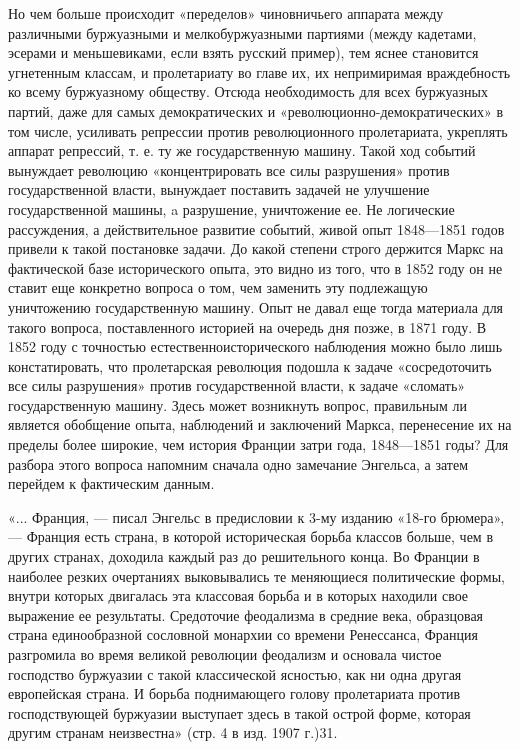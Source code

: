 \documentclass[12pt]{article}
\newcommand{\parnum}{(\arabic{parcount})}
\newcounter{parcount}
\newcommand\p{%
    \stepcounter{parcount}%
    \noindent\marginpar[]{\parnum}%
}
\begin{document}
\p Но чем больше происходит «переделов» чиновничьего аппарата между различными буржуазными и мелкобуржуазными партиями (между кадетами, эсерами и меньшевиками, если взять русский пример), тем яснее становится угнетенным классам, и пролетариату во главе их, их непримиримая враждебность ко всему буржуазному обществу. Отсюда необходимость для всех буржуазных партий, даже для самых демократических и «революционно-демократических» в том числе, усиливать репрессии против революционного пролетариата, укреплять аппарат репрессий, т. е. ту же государственную машину. Такой ход событий вынуждает революцию «концентрировать все силы разрушения» против государственной власти, вынуждает поставить задачей не улучшение государственной машины, a разрушение, уничтожение ее. Не логические рассуждения, а действительное развитие событий, живой опыт 1848—1851 годов привели к такой постановке задачи. До какой степени строго держится Маркс на фактической базе исторического опыта, это видно из того, что в 1852 году он не ставит еще конкретно вопроса о том, чем заменить эту подлежащую уничтожению государственную машину. Опыт не давал еще тогда материала для такого вопроса, поставленного историей на очередь дня позже, в 1871 году. В 1852 году с точностью естественноисторического наблюдения можно было лишь констатировать, что пролетарская революция подошла к задаче «сосредоточить все силы разрушения» против государственной власти, к задаче «сломать» государственную машину. Здесь может возникнуть вопрос, правильным ли является обобщение опыта, наблюдений и заключений Маркса, перенесение их на пределы более широкие, чем история Франции затри года, 1848—1851 годы? Для разбора этого вопроса напомним сначала одно замечание Энгельса, а затем перейдем к фактическим данным.

\p «... Франция, — писал Энгельс в предисловии к 3-му изданию «18-го брюмера», — Франция есть страна, в которой историческая борьба классов больше, чем в других странах, доходила каждый раз до решительного конца. Во Франции в наиболее резких очертаниях выковывались те меняющиеся политические формы, внутри которых двигалась эта классовая борьба и в которых находили свое выражение ее результаты. Средоточие феодализма в средние века, образцовая страна единообразной сословной монархии со времени Ренессанса, Франция разгромила во время великой революции феодализм и основала чистое господство буржуазии с такой классической ясностью, как ни одна другая европейская страна. И борьба поднимающего голову пролетариата против господствующей буржуазии выступает здесь в такой острой форме, которая другим странам неизвестна» (стр. 4 в изд. 1907 г.)31.
\end{document}
